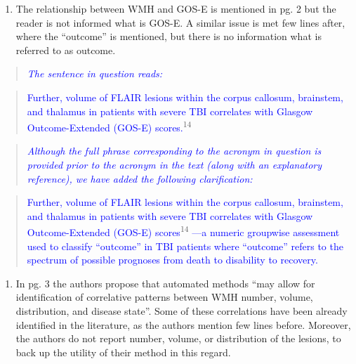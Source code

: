 \documentclass[12pt,]{article}
\providecommand{\tightlist}{%
  \setlength{\itemsep}{0pt}\setlength{\parskip}{0pt}}
\begin{document}
\begin{enumerate}
\def\labelenumi{\arabic{enumi}.}
\setcounter{enumi}{7}
\tightlist
\item
  The relationship between WMH and GOS-E is mentioned in pg. 2 but the
  reader is not informed what is GOS-E. A similar issue is met few lines
  after, where the ``outcome'' is mentioned, but there is no information
  what is referred to as outcome.
\end{enumerate}

\begin{quote}
\emph{\textcolor{blue}{The sentence in question reads:}}
\end{quote}

\begin{quote}
\textcolor{blue}{Further, volume of FLAIR lesions within the corpus
callosum, brainstem, and thalamus in patients with severe TBI correlates
with Glasgow Outcome-Extended (GOS-E) scores.}\textsuperscript{14}
\end{quote}

\begin{quote}
\emph{\textcolor{blue}{Although the full phrase corresponding to the acronym
in question is provided prior to the acronym in the text (along with an
explanatory reference), we have added the following clarification:}}
\end{quote}

\begin{quote}
\textcolor{blue}{Further, volume of FLAIR lesions within the corpus
callosum, brainstem, and thalamus in patients with severe TBI correlates
with Glasgow Outcome-Extended (GOS-E) scores}\textsuperscript{14}
\textcolor{blue}{---a numeric groupwise assessment used to
classify ``outcome'' in TBI patients where ``outcome'' refers to the
spectrum of possible prognoses from death to disability to recovery.}
\end{quote}

\begin{enumerate}
\def\labelenumi{\arabic{enumi}.}
\setcounter{enumi}{8}
\tightlist
\item
  In pg. 3 the authors propose that automated methods ``may allow for
  identification of correlative patterns between WMH number, volume,
  distribution, and disease state''. Some of these correlations have
  been already identified in the literature, as the authors mention few
  lines before. Moreover, the authors do not report number, volume, or
  distribution of the lesions, to back up the utility of their method in
  this regard.
\end{enumerate}
\end{document}
